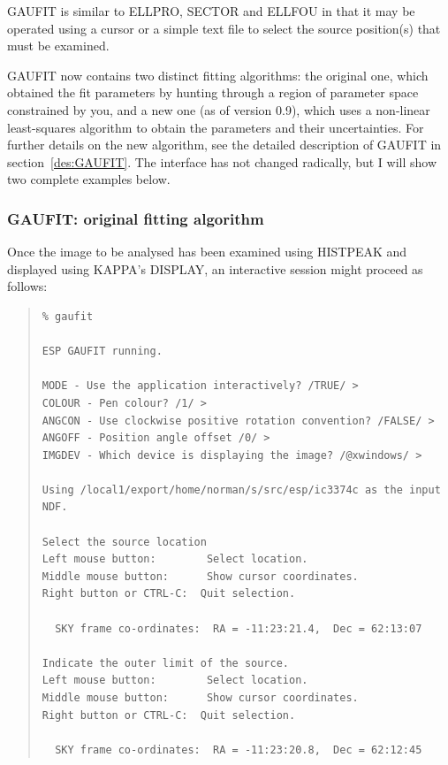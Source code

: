 \documentclass[twoside,11pt]{article}
\newcommand{\xref}[3]{#1}
\newenvironment{myquote}{\begin{quote}\begin{small}}{\end{small}\end{quote}}
\begin{document}
GAUFIT is similar to ELLPRO, SECTOR and ELLFOU in that it may be operated
using a cursor or a simple text file to select the source position(s) that 
must be examined. 

GAUFIT now contains two distinct fitting algorithms: the original one,
which obtained the fit parameters by hunting through a region of
parameter space constrained by you, and a new one (as of version 0.9),
which uses a non-linear least-squares algorithm to obtain the
parameters and their uncertainties.  For further details on the new
algorithm, see the detailed description of GAUFIT in
section~\ref{des:GAUFIT}.  The interface has not changed radically,
but I will show two complete examples below.







\subsubsection{GAUFIT: original fitting algorithm}

Once the image to be analysed has been examined using 
HISTPEAK and displayed using \xref{KAPPA}{sun95}{}'s DISPLAY, an interactive 
session might proceed as follows:

\begin{myquote}
\begin{verbatim}
% gaufit

ESP GAUFIT running.

MODE - Use the application interactively? /TRUE/ > 
COLOUR - Pen colour? /1/ > 
ANGCON - Use clockwise positive rotation convention? /FALSE/ > 
ANGOFF - Position angle offset /0/ > 
IMGDEV - Which device is displaying the image? /@xwindows/ > 

Using /local1/export/home/norman/s/src/esp/ic3374c as the input NDF.

Select the source location
Left mouse button:        Select location.
Middle mouse button:      Show cursor coordinates.
Right button or CTRL-C:  Quit selection.

  SKY frame co-ordinates:  RA = -11:23:21.4,  Dec = 62:13:07

Indicate the outer limit of the source.
Left mouse button:        Select location.
Middle mouse button:      Show cursor coordinates.
Right button or CTRL-C:  Quit selection.

  SKY frame co-ordinates:  RA = -11:23:20.8,  Dec = 62:12:45
\end{verbatim}
\end{myquote}
\end{document}
